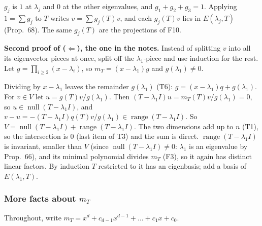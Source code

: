 \documentclass[10pt]{scrartcl}
\newenvironment{fig}{\par\needspace{9\baselineskip}\medskip\begin{center}}{\end{center}\medskip}
\newcommand{\figcap}[1]{\par\vspace{3pt}\begin{minipage}{0.86\linewidth}\small\centering #1\end{minipage}}
\DeclareMathOperator{\nul}{null}
\DeclareMathOperator{\range}{range}
\newenvironment{steps}{\begin{enumerate}[label=\arabic*.,leftmargin=1.5em,itemsep=2pt,topsep=2pt]}{\end{enumerate}}
\begin{document}
\begin{fig}
\figcap{$g_j$ is $1$ at $\lambda_j$ and $0$ at the other eigenvalues, and $g_1+g_2+g_3=1$. Applying $1=\sum g_j$ to $T$ writes $v=\sum g_j(T)v$, and each $g_j(T)v$ lies in $E(\lambda_j,T)$ (Prop.~68). The same $g_j(T)$ are the projections of F10.}
\end{fig}
\textbf{Second proof of ($\Leftarrow$), the one in the notes.} Instead of splitting $v$ into all its eigenvector pieces at once, split off the $\lambda_1$-piece and use induction for the rest. Let $g=\prod_{i\ge2}(x-\lambda_i)$, so $m_T=(x-\lambda_1)g$ and $g(\lambda_1)\ne0$.
\begin{steps}
  \ii Dividing by $x-\lambda_1$ leaves the remainder $g(\lambda_1)$ (T6): $g=(x-\lambda_1)q+g(\lambda_1)$.
  \ii For $v\in V$ let $u=g(T)v/g(\lambda_1)$. Then $(T-\lambda_1I)u=m_T(T)v/g(\lambda_1)=0$, so $u\in\nul(T-\lambda_1I)$, and $v-u=-(T-\lambda_1I)q(T)v/g(\lambda_1)\in\range(T-\lambda_1I)$.
  \ii So $V=\nul(T-\lambda_1I)+\range(T-\lambda_1I)$. The two dimensions add up to $n$ (T1), so the intersection is $0$ (last item of T3) and the sum is direct.
  \ii $\range(T-\lambda_1I)$ is invariant, smaller than $V$ (since $\nul(T-\lambda_1I)\ne0$: $\lambda_1$ is an eigenvalue by Prop.~66), and its minimal polynomial divides $m_T$ (F3), so it again has distinct linear factors. By induction $T$ restricted to it has an eigenbasis; add a basis of $E(\lambda_1,T)$.
\end{steps}

\subsubsection*{More facts about $m_T$}
Throughout, write $m_T=x^d+c_{d-1}x^{d-1}+\dots+c_1x+c_0$.
\end{document}
